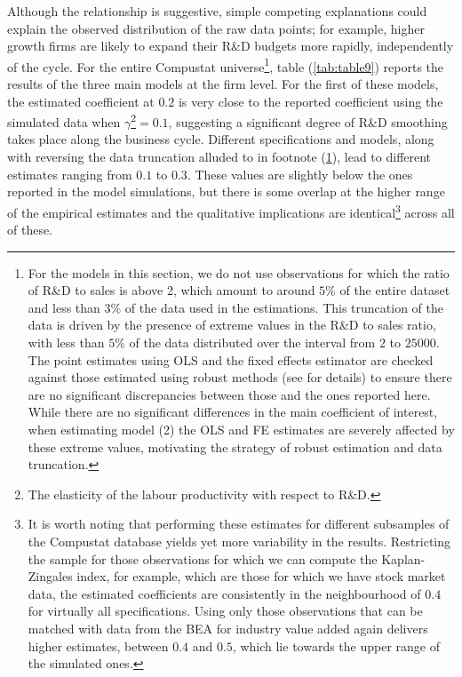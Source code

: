 \documentclass{_latex/house}
\begin{document}
Although the relationship is suggestive, simple competing explanations could explain the observed distribution of the raw data points; for example, higher growth firms are likely to expand their R\&D budgets more rapidly, independently of the cycle. For the entire Compustat universe\footnote{\label{fn:truncationnote}For the models in this section, we do not use observations for which the ratio of R\&D to sales is above 2, which amount to around $5\%$ of the entire dataset and less than $3\%$ of the data used in the estimations. This truncation of the data is driven by the presence of extreme values in the R\&D to sales ratio, with less than $5\%$ of the data distributed over the interval from $2$ to $25000$. The point estimates using OLS and the fixed effects estimator are checked against those estimated using robust methods (see \cite{Huber.Wiley.ea1981Robuststatistics} for details) to ensure there are no significant discrepancies between those and the ones reported here. While there are no significant differences in the main coefficient of interest, when estimating model (2) the OLS and FE estimates are severely affected by these extreme values, motivating the strategy of robust estimation and data truncation.}, table (\ref{tab:table9}) reports the results of the three main models at the firm level. For the first of these models, the estimated coefficient at $0.2$ is very close to the reported coefficient using the simulated data when $\gamma$\footnote{The elasticity of the labour productivity with respect to R\&D.}$=0.1$, suggesting a significant degree of R\&D smoothing takes place along the business cycle. Different specifications and models, along with reversing the data truncation alluded to in footnote (\ref{fn:truncationnote}), lead to different estimates ranging from $0.1$ to $0.3$. These values are slightly below the ones reported in the model simulations, but there is some overlap at the higher range of the empirical estimates and the qualitative implications are identical\footnote{It is worth noting that performing these estimates for different subsamples of the Compustat database yields yet more variability in the results. Restricting the sample for those observations for which we can compute the Kaplan-Zingales index, for example, which are those for which we have stock market data, the estimated coefficients are consistently in the neighbourhood of $0.4$ for virtually all specifications. Using only those observations that can be matched with data from the BEA for industry value added again delivers higher estimates, between $0.4$ and $0.5$, which lie towards the upper range of the simulated ones.} across all of these.
\end{document}
